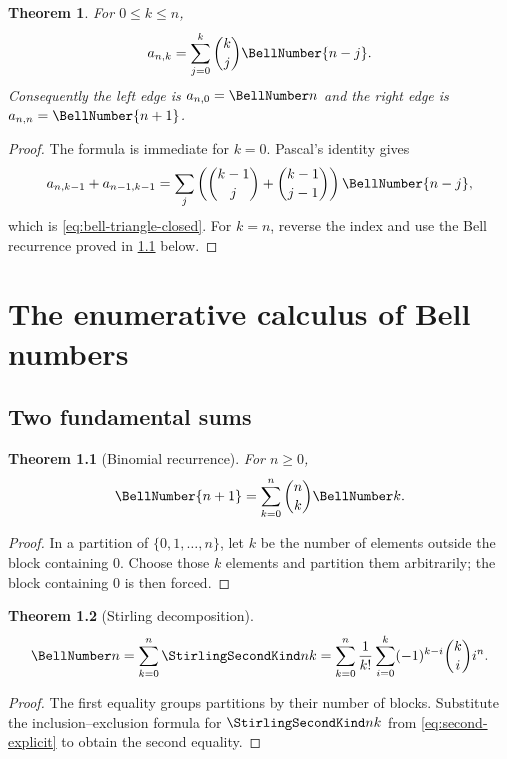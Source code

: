 \documentclass[11pt,a4paper,oneside,openany]{book}
\newtheorem{theorem}{Theorem}[chapter]
\theoremstyle{definition}
\theoremstyle{remark}
\begin{document}
\begin{theorem}
For $0\le k\le n$,
\begin{equation}\label{eq:bell-triangle-closed}
 a_{n,k}=\sum_{j=0}^{k}\binom{k}{j}\BellNumber{n-j}.
\end{equation}
Consequently the left edge is $a_{n,0}=\BellNumber n$ and the right edge is
$a_{n,n}=\BellNumber{n+1}$.
\end{theorem}
\begin{proof}
The formula is immediate for $k=0$.  Pascal's identity gives
\[
 a_{n,k-1}+a_{n-1,k-1}
 =\sum_j\left(\binom{k-1}{j}+\binom{k-1}{j-1}\right)\BellNumber{n-j},
\]
which is \eqref{eq:bell-triangle-closed}.  For $k=n$, reverse the index and use
the Bell recurrence proved in \cref{thm:bell-binomial-recurrence} below.
\end{proof}

\chapter{The enumerative calculus of Bell numbers}

\section{Two fundamental sums}
\begin{theorem}[Binomial recurrence]\label{thm:bell-binomial-recurrence}
For $n\ge0$,
\begin{equation}\label{eq:bell-binomial-recurrence}
 \BellNumber{n+1}=\sum_{k=0}^{n}\binom nk\BellNumber k.
\end{equation}
\end{theorem}
\begin{proof}
In a partition of $\{0,1,\ldots,n\}$, let $k$ be the number of elements outside
the block containing $0$.  Choose those $k$ elements and partition them
arbitrarily; the block containing $0$ is then forced.
\end{proof}

\begin{theorem}[Stirling decomposition]
\begin{equation}\label{eq:bell-stirling-sum}
 \BellNumber n=\sum_{k=0}^{n}\StirlingSecondKind nk
 =\sum_{k=0}^{n}\frac1{k!}\sum_{i=0}^{k}(-1)^{k-i}\binom ki i^n.
\end{equation}
\end{theorem}
\begin{proof}
The first equality groups partitions by their number of blocks.  Substitute the
inclusion--exclusion formula for $\StirlingSecondKind nk$ from
\cref{eq:second-explicit} to obtain the second equality.
\end{proof}
\end{document}
